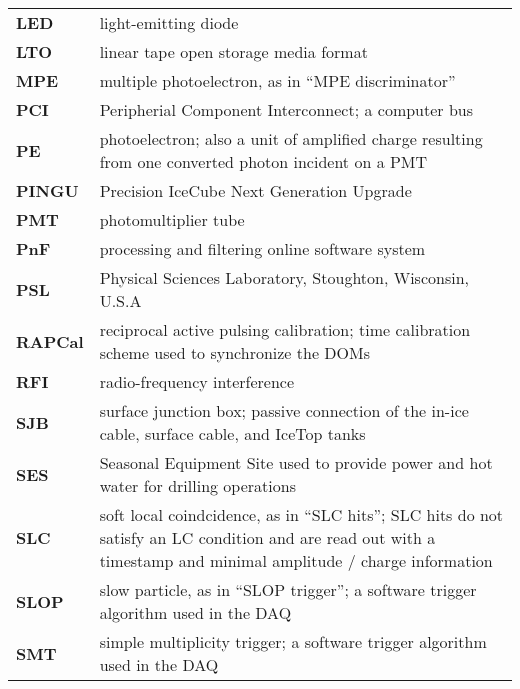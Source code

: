\begin{longtable}{p{} p{}}
  \textbf{LED} & light-emitting diode \\

  \textbf{LTO} & linear tape open storage media format \\
  
  \textbf{MPE} & multiple photoelectron, as in ``MPE discriminator'' \\

  \textbf{PCI} & Peripherial Component Interconnect; a computer bus \\
  
  \textbf{PE} & photoelectron; also a unit of amplified charge resulting
  from one converted photon incident on a PMT \\

  \textbf{PINGU} & Precision IceCube Next Generation Upgrade \\
  
  \textbf{PMT} & photomultiplier tube \\

  \textbf{PnF} & processing and filtering online software system \\
  
  \textbf{PSL} & Physical Sciences Laboratory, Stoughton, Wisconsin, U.S.A \\

  \textbf{RAPCal} & reciprocal active pulsing calibration; time calibration
  scheme used to synchronize the DOMs \\

  \textbf{RFI} & radio-frequency interference \\

  \textbf{SJB} & surface junction box; passive connection of the in-ice
  cable, surface cable, and IceTop tanks \\

  \textbf{SES} & Seasonal Equipment Site used to provide power and hot
  water for drilling operations \\
  
  \textbf{SLC} & soft local coindcidence, as in ``SLC hits''; SLC hits do
  not satisfy an LC condition and are read out with a timestamp and minimal
  amplitude / charge information \\

  \textbf{SLOP} & slow particle, as in ``SLOP trigger''; a software trigger
  algorithm used in the DAQ \\
  
  \textbf{SMT} & simple multiplicity trigger; a software trigger algorithm
  used in the DAQ \\


\end{longtable}
